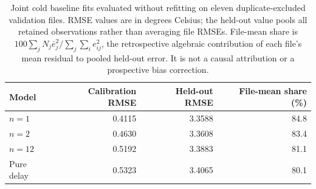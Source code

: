 \begin{table}[tbp]
\centering\small
\begin{tabular}{lrrr}
\toprule
Model & Calibration RMSE & Held-out RMSE & File-mean share (\%) \\
\midrule
$n=1$ & 0.4115 & 3.3588 & 84.8 \\
$n=2$ & 0.4630 & 3.3608 & 83.4 \\
$n=12$ & 0.5192 & 3.3883 & 81.1 \\
Pure delay & 0.5323 & 3.4065 & 80.1 \\
\bottomrule
\end{tabular}
\caption{Joint cold baseline fits evaluated without refitting on eleven duplicate-excluded validation files. RMSE values are in degrees Celsius; the held-out value pools all retained observations rather than averaging file RMSEs. File-mean share is $100\sum_j N_j\bar e_j^2/\sum_j\sum_i e_{ij}^2$, the retrospective algebraic contribution of each file's mean residual to pooled held-out error. It is not a causal attribution or a prospective bias correction.}
\label{tab:validation-summary}
\end{table}
